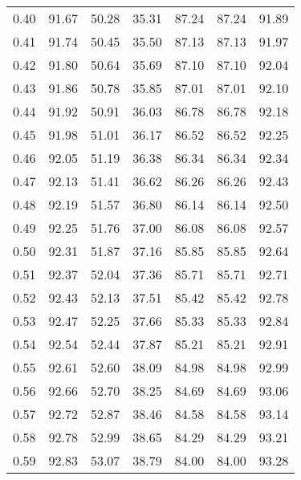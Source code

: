 \begin{tabular}{|c|c|c|c|c|c|c|}
      0.40 &     91.67 &     50.28 &      35.31 &   87.24 &      87.24 &         91.89 \\
      0.41 &     91.74 &     50.45 &      35.50 &   87.13 &      87.13 &         91.97 \\
      0.42 &     91.80 &     50.64 &      35.69 &   87.10 &      87.10 &         92.04 \\
      0.43 &     91.86 &     50.78 &      35.85 &   87.01 &      87.01 &         92.10 \\
      0.44 &     91.92 &     50.91 &      36.03 &   86.78 &      86.78 &         92.18 \\
      0.45 &     91.98 &     51.01 &      36.17 &   86.52 &      86.52 &         92.25 \\
      0.46 &     92.05 &     51.19 &      36.38 &   86.34 &      86.34 &         92.34 \\
      0.47 &     92.13 &     51.41 &      36.62 &   86.26 &      86.26 &         92.43 \\
      0.48 &     92.19 &     51.57 &      36.80 &   86.14 &      86.14 &         92.50 \\
      0.49 &     92.25 &     51.76 &      37.00 &   86.08 &      86.08 &         92.57 \\
      0.50 &     92.31 &     51.87 &      37.16 &   85.85 &      85.85 &         92.64 \\
      0.51 &     92.37 &     52.04 &      37.36 &   85.71 &      85.71 &         92.71 \\
      0.52 &     92.43 &     52.13 &      37.51 &   85.42 &      85.42 &         92.78 \\
      0.53 &     92.47 &     52.25 &      37.66 &   85.33 &      85.33 &         92.84 \\
      0.54 &     92.54 &     52.44 &      37.87 &   85.21 &      85.21 &         92.91 \\
      0.55 &     92.61 &     52.60 &      38.09 &   84.98 &      84.98 &         92.99 \\
      0.56 &     92.66 &     52.70 &      38.25 &   84.69 &      84.69 &         93.06 \\
      0.57 &     92.72 &     52.87 &      38.46 &   84.58 &      84.58 &         93.14 \\
      0.58 &     92.78 &     52.99 &      38.65 &   84.29 &      84.29 &         93.21 \\
      0.59 &     92.83 &     53.07 &      38.79 &   84.00 &      84.00 &         93.28 \\

\end{tabular}
